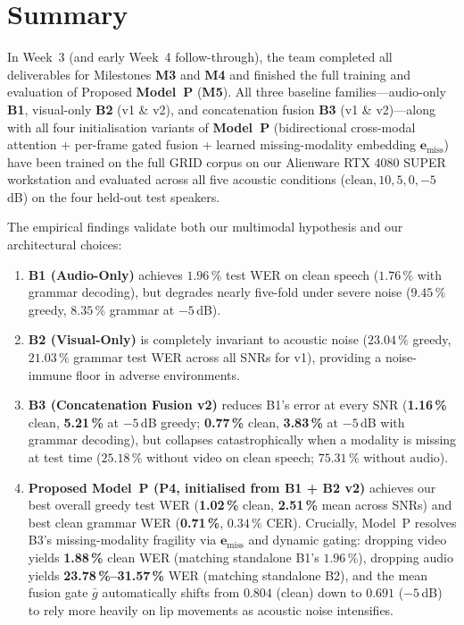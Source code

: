 \documentclass[11pt,a4paper]{article}
\begin{document}

\section{Summary}
In Week~3 (and early Week~4 follow-through), the team completed all deliverables for Milestones \textbf{M3} and \textbf{M4} and finished the full training and evaluation of Proposed \textbf{Model~P} (\textbf{M5}). All three baseline families---audio-only \textbf{B1}, visual-only \textbf{B2} (v1 \& v2), and concatenation fusion \textbf{B3} (v1 \& v2)---along with all four initialisation variants of \textbf{Model~P} (bidirectional cross-modal attention + per-frame gated fusion + learned missing-modality embedding $\mathbf{e}_{\text{miss}}$) have been trained on the full GRID corpus on our Alienware RTX 4080 SUPER workstation and evaluated across all five acoustic conditions ($\text{clean}, 10, 5, 0, -5$\,dB) on the four held-out test speakers.

The empirical findings validate both our multimodal hypothesis and our architectural choices:
\begin{enumerate}
  \item \textbf{B1 (Audio-Only)} achieves $1.96\,\%$ test WER on clean speech ($1.76\,\%$ with grammar decoding), but degrades nearly five-fold under severe noise ($9.45\,\%$ greedy, $8.35\,\%$ grammar at $-5$\,dB).
  \item \textbf{B2 (Visual-Only)} is completely invariant to acoustic noise ($23.04\,\%$ greedy, $21.03\,\%$ grammar test WER across all SNRs for v1), providing a noise-immune floor in adverse environments.
  \item \textbf{B3 (Concatenation Fusion v2)} reduces B1's error at every SNR (\textbf{1.16\,\%} clean, \textbf{5.21\,\%} at $-5$\,dB greedy; \textbf{0.77\,\%} clean, \textbf{3.83\,\%} at $-5$\,dB with grammar decoding), but collapses catastrophically when a modality is missing at test time ($25.18\,\%$ without video on clean speech; $75.31\,\%$ without audio).
  \item \textbf{Proposed Model~P (P4, initialised from B1 + B2 v2)} achieves our best overall greedy test WER (\textbf{1.02\,\%} clean, \textbf{2.51\,\%} mean across SNRs) and best clean grammar WER (\textbf{0.71\,\%}, $0.34\,\%$ CER). Crucially, Model~P resolves B3's missing-modality fragility via $\mathbf{e}_{\text{miss}}$ and dynamic gating: dropping video yields \textbf{1.88\,\%} clean WER (matching standalone B1's $1.96\,\%$), dropping audio yields \textbf{23.78\,\%--31.57\,\%} WER (matching standalone B2), and the mean fusion gate $\bar{g}$ automatically shifts from $0.804$ (clean) down to $0.691$ ($-5$\,dB) to rely more heavily on lip movements as acoustic noise intensifies.
\end{enumerate}
\end{document}
